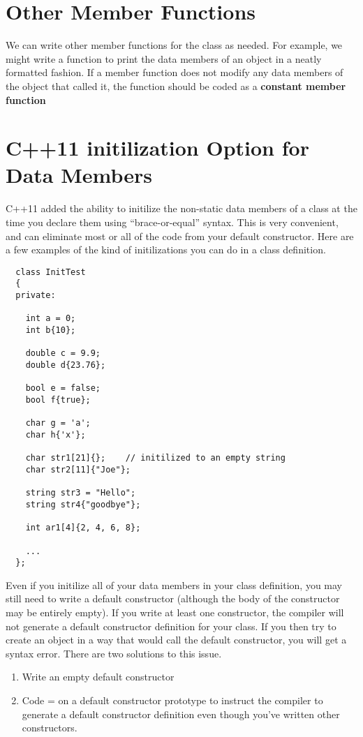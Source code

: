 \documentclass{report}
\begin{document}
  \section{Other Member Functions}
  We can write other member functions for the class as needed. For example, we might write a function to print the data members of an object in a neatly formatted fashion.
  \bigbreak \noindent
  If a member function does not modify any data members of the object that called it, the function should be coded as a \textbf{constant member function} 
  \section{C++11 initilization Option for Data Members}
  C++11 added the ability to initilize the non-static data members of a class at the time you declare them using ``brace-or-equal'' syntax. This is very convenient, and can eliminate most or all of the code from your default constructor. Here are a few examples of the kind of initilizations you can do in a class definition.
  \begin{mdframed}
  \begin{verbatim}
  class InitTest
  {
  private:

    int a = 0;
    int b{10};

    double c = 9.9;
    double d{23.76};

    bool e = false;
    bool f{true};

    char g = 'a';
    char h{'x'};

    char str1[21]{};    // initilized to an empty string
    char str2[11]{"Joe"};

    string str3 = "Hello";
    string str4{"goodbye"};

    int ar1[4]{2, 4, 6, 8};

    ... 
  };
  \end{verbatim}
  \end{mdframed}
  Even if you initilize all of your data members in your class definition, you may still need to write a default constructor (although the body of the constructor may be entirely empty). If you write at least one constructor, the compiler will not generate a default constructor definition for your class. If you then try to create an object in a way that would call the default constructor, you will get a syntax error.
  \bigbreak \noindent
  There are two solutions to this issue.
\begin{enumerate}
  \item Write an empty default constructor
  \item Code =  on a default constructor prototype to instruct the compiler to generate a default constructor definition even though you've written other constructors.
\end{enumerate}
\end{document}
